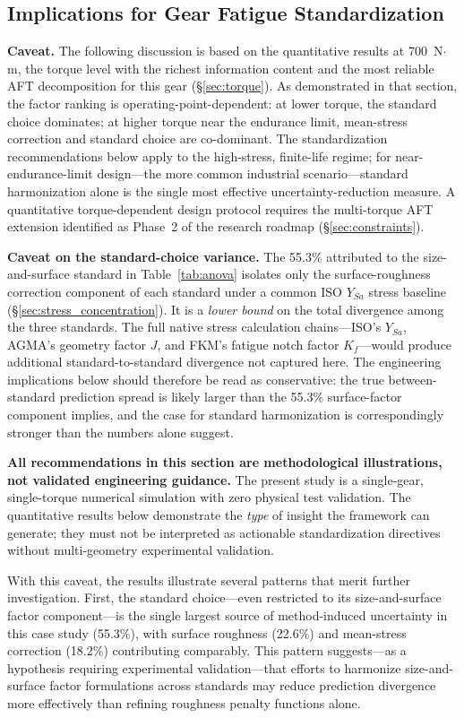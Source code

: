 \documentclass[twocolumn,12pt,a4paper]{article}
\begin{document}
\subsection{Implications for Gear Fatigue Standardization}

\textbf{Caveat.} The following discussion is based on the quantitative
results at 700~N$\cdot$m, the torque level with the richest
information content and the most reliable AFT decomposition for this
gear (\S\ref{sec:torque}). As
demonstrated in that section, the factor ranking is
operating-point-dependent: at lower torque, the standard choice
dominates; at higher torque near the endurance limit, mean-stress
correction and standard choice are co-dominant. The standardization
recommendations below apply to
the high-stress, finite-life regime; for near-endurance-limit
design---the more common industrial scenario---standard harmonization
alone is the single most effective uncertainty-reduction measure.
A quantitative torque-dependent design protocol requires the
multi-torque AFT extension identified as Phase~2 of the research
roadmap (\S\ref{sec:constraints}).

\textbf{Caveat on the standard-choice variance.} The 55.3\% attributed
to the size-and-surface standard in Table~\ref{tab:anova} isolates
only the surface-roughness correction component of each standard
under a common ISO $Y_{Sa}$ stress baseline
(\S\ref{sec:stress_concentration}). It is a \emph{lower bound} on the
total divergence among the three standards. The full native stress
calculation chains---ISO's $Y_{Sa}$, AGMA's geometry factor $J$, and
FKM's fatigue notch factor $K_f$---would produce additional
standard-to-standard divergence not captured here. The engineering
implications below should therefore be read as conservative: the true
between-standard prediction spread is likely larger than the 55.3\%
surface-factor component implies, and the case for standard
harmonization is correspondingly stronger than the numbers alone
suggest.

\textbf{All recommendations in this section are methodological
illustrations, not validated engineering guidance.} The present study
is a single-gear, single-torque numerical simulation with zero
physical test validation. The quantitative results below demonstrate
the \emph{type} of insight the framework can generate; they must not
be interpreted as actionable standardization directives without
multi-geometry experimental validation.

With this caveat, the results illustrate several patterns that merit
further investigation. First, the standard choice---even restricted to
its size-and-surface factor component---is the single largest source
of method-induced uncertainty in this case study (55.3\%), with
surface roughness (22.6\%) and mean-stress correction (18.2\%)
contributing comparably. This pattern suggests---as a hypothesis
requiring experimental validation---that efforts to harmonize
size-and-surface factor formulations across standards may reduce
prediction divergence more effectively than refining roughness penalty
functions alone.
\end{document}
